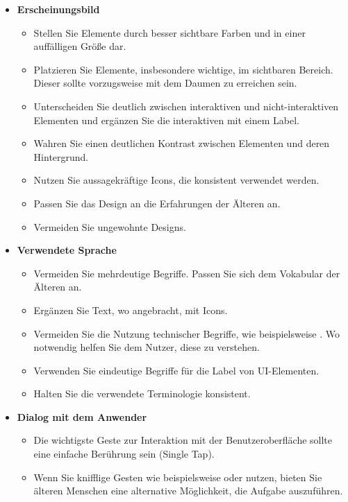 \begin{table}[p]
	\small
	\begin{itemize}[label={}]
		\item \textbf{Erscheinungsbild}
		\begin{itemize}[nosep]
			\item Stellen Sie Elemente durch besser sichtbare Farben und in einer auffälligen Größe dar.
			\item Platzieren Sie Elemente, insbesondere wichtige, im sichtbaren Bereich. Dieser sollte vorzugsweise mit dem Daumen zu erreichen sein.
			\item Unterscheiden Sie deutlich zwischen interaktiven und nicht-interaktiven Elementen und ergänzen Sie die interaktiven mit einem Label.
			\item Wahren Sie einen deutlichen Kontrast zwischen Elementen und deren Hintergrund.
			\item Nutzen Sie aussagekräftige Icons, die konsistent verwendet werden.
			\item Passen Sie das Design an die Erfahrungen der Älteren an.
			\item Vermeiden Sie ungewohnte Designs.
		\end{itemize}
		\item \textbf{Verwendete Sprache}
		\begin{itemize}[nosep]
			\item Vermeiden Sie mehrdeutige Begriffe. Passen Sie sich dem Vokabular der Älteren an.
			\item Ergänzen Sie Text, wo angebracht, mit Icons.
			\item Vermeiden Sie die Nutzung technischer Begriffe, wie beispielsweise . Wo notwendig helfen Sie dem Nutzer, diese zu verstehen.
			\item Verwenden Sie eindeutige Begriffe für die Label von UI-Elementen.
			\item Halten Sie die verwendete Terminologie konsistent.
		\end{itemize}
		\item \textbf{Dialog mit dem Anwender}
		\begin{itemize}[nosep]
			\item Die wichtigste Geste zur Interaktion mit der Benutzeroberfläche sollte eine einfache Berührung sein (Single Tap).
			\item Wenn Sie knifflige Gesten wie beispielsweise  oder  nutzen, bieten Sie älteren Menschen eine alternative Möglichkeit, die Aufgabe auszuführen.

\end{itemize}
\end{itemize}
\end{table}
